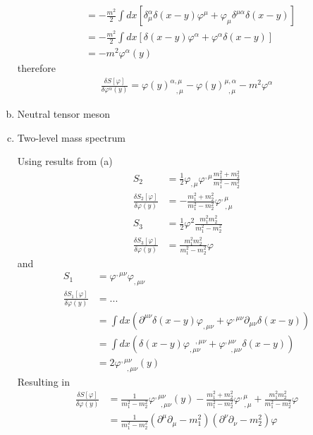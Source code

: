 \documentclass[10pt,a4paper]{book}
\theoremstyle{definition}
\begin{document}
\begin{enumerate}[(a)]
\begin{align}
&=-\frac{m^2}{2}\int dx\left[\delta_\mu^\alpha\delta(x-y)\varphi^\mu+\varphi_\mu\delta^{\mu\alpha}\delta(x-y)\right]\\
&=-\frac{m^2}{2}\int dx\left[\delta(x-y)\varphi^\alpha+\varphi^\alpha\delta(x-y)\right]\\
&=-m^2\varphi^\alpha(y)
\end{align}
therefore
\begin{align}
\frac{\delta S[\varphi]}{\delta\varphi^\alpha(y)}=\varphi(y)^{\alpha,\mu}_{\;\;\;,\mu}-\varphi(y)^{\mu,\alpha}_{\;\;,\mu}-m^2\varphi^\alpha
\end{align}

\item Neutral tensor meson

\item Two-level mass spectrum

Using results from (a)
\begin{align}
S_2&=\frac{1}{2}\varphi_{,\mu}\varphi^{,\mu}\frac{m_1^2+m_2^2}{m_1^2-m_2^2}\\
\frac{\delta S_2[\varphi]}{\delta\varphi(y)}&=-\frac{m_1^2+m_2^2}{m_1^2-m_2^2}\varphi^{,\mu}_{\;\;,\mu}\\
S_3&=\frac{1}{2}\varphi^2\frac{m_1^2m_2^2}{m_1^2-m_2^2}\\
\frac{\delta S_3[\varphi]}{\delta\varphi(y)}&=\frac{m_1^2m_2^2}{m_1^2-m_2^2}\varphi
\end{align}
and
\begin{align}
S_1&=\varphi^{,\mu\nu}\varphi_{,\mu\nu}\\
\frac{\delta S_1[\varphi]}{\delta\varphi(y)}
&=...\\
&=\int dx \left(\partial^{\mu\nu}\delta(x-y)\varphi_{,\mu\nu}+\varphi^{,\mu\nu}\partial_{\mu\nu}\delta(x-y)\right)\\
&=\int dx \left(\delta(x-y)\varphi_{,\mu\nu}^{\;\;\;,\mu\nu}+\varphi^{,\mu\nu}_{\;\;\;,\mu\nu}\delta(x-y)\right)\\
&=2\varphi^{,\mu\nu}_{\;\;\;,\mu\nu}(y)
\end{align}
Resulting in
\begin{align}
\frac{\delta S[\varphi]}{\delta\varphi(y)}
&=\frac{1}{m_1^2-m_2^2}\varphi^{,\mu\nu}_{\;\;\;,\mu\nu}(y)
-\frac{m_1^2+m_2^2}{m_1^2-m_2^2}\varphi^{,\mu}_{\;\;,\mu}
+\frac{m_1^2m_2^2}{m_1^2-m_2^2}\varphi\\
&=\frac{1}{m_1^2-m_2^2}(\partial^\mu\partial_{\mu}-m_1^2)(\partial^\nu\partial_{\nu}-m_2^2)\varphi
\end{align}
\end{enumerate}
\end{document}
